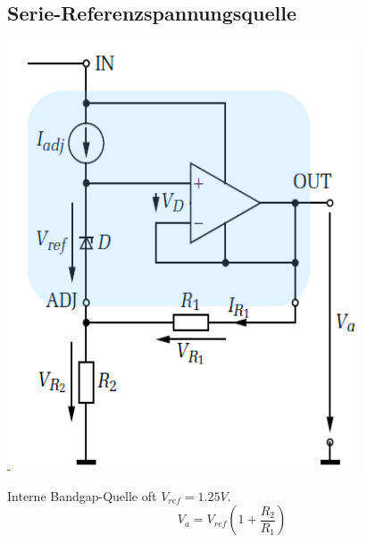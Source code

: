 \subsection{Serie-Referenzspannungsquelle}
\begin{center}
	\includegraphics[width=0.4\columnwidth]{Images/serie-refquelle}
\end{center}
Interne Bandgap-Quelle oft $V_{ref} = 1.25V$.
\[
V_a = V_{ref} \left(1 + \frac{R_2}{R_1}\right)
\]